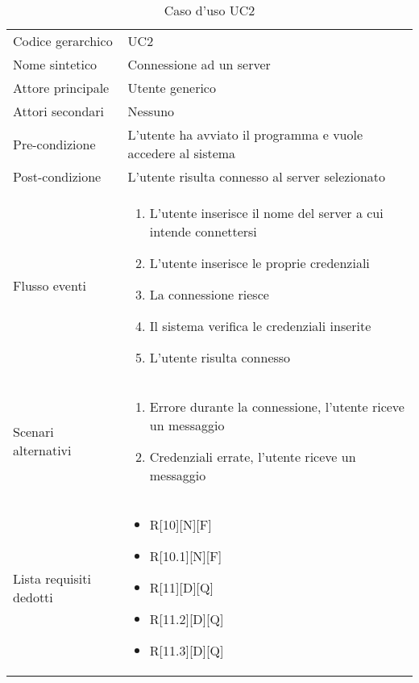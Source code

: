 \documentclass[a4paper]{report}
\begin{document}
			\begin{table}[H]
			\begin{tabularx}{\textwidth}{X | X}\toprule
				\rowcolor{orange!65}Codice gerarchico & UC2 \\
				Nome sintetico & Connessione ad un server \\
				\rowcolor{orange!65}Attore principale & Utente generico\\
				Attori secondari & Nessuno \\
				\rowcolor{orange!65}Pre-condizione & L'utente ha avviato il programma e vuole accedere al
				 sistema\\
				Post-condizione & L'utente risulta connesso al server selezionato \\
				\rowcolor{orange!65}Flusso eventi & \begin{enumerate}
				\item L'utente inserisce il nome del server a cui intende connettersi
				\item L'utente inserisce le proprie credenziali
				\item La connessione riesce
				\item Il sistema verifica le credenziali inserite
				\item L'utente risulta connesso
				\end{enumerate} \\
				Scenari alternativi & \begin{enumerate}
				\item Errore durante la connessione, l'utente riceve un messaggio
				\item Credenziali errate, l'utente riceve un messaggio
				\end{enumerate} \\
				\rowcolor{orange!65}Lista requisiti dedotti & \begin{itemize}
				\item R[10][N][F]
				\item R[10.1][N][F]
				\item R[11][D][Q]
				\item R[11.2][D][Q]
				\item R[11.3][D][Q]
				\end{itemize} \\
				\bottomrule
			\end{tabularx}
			\caption{Caso d'uso UC2}
		 \end{table}
\end{document}
